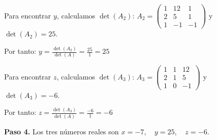 \begin{example}
\begin{myproof}
Para encontrar $y$, calculamos $\det(A_2)$: $A_2 = \begin{pmatrix}
1 & 12 & 1 \\
2 & 5 & 1 \\
1 & -1 & -1
\end{pmatrix}$ y $\det(A_2) = 25.$

Por tanto: $y = \frac{\det(A_2)}{\det(A)} = \frac{25}{1} = 25$

Para encontrar $z$, calculamos $\det(A_3)$:
$A_3 = \begin{pmatrix}
1 & 1 & 12 \\
2 & 1 & 5 \\
1 & 0 & -1
\end{pmatrix}$ y $\det(A_3) = -6.$

Por tanto: $z = \frac{\det(A_3)}{\det(A)} = \frac{-6}{1} = -6$

\textbf{Paso 4.} Los tres números reales son \( \boxed{x = -7, \quad y = 25, \quad z = -6} \).
\end{myproof}
\end{example}

